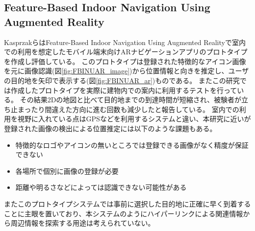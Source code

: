 \subsection{Feature-Based Indoor Navigation Using Augmented Reality}
KasprzakらはFeature-Based Indoor Navigation Using Augmented Reality\cite{6597797}で室内での利用を想定したモバイル端末向けARナビゲーションアプリのプロトタイプを作成し評価している。
このプロトタイプは登録された特徴的なアイコン画像を元に画像認識(図\ref{fig:FBINUAR_image})から位置情報と向きを推定し、ユーザの目的地を矢印で表示する(図\ref{fig:FBINUAR_ar})ものである。
またこの研究では作成したプロトタイプを実際に建物内での案内に利用するテストを行っている。
その結果2Dの地図と比べて目的地までの到達時間が短縮され、被験者が立ち止まったり間違えた方向に進む回数も減少したと報告している。
室内での利用を視野に入れている点はGPSなどを利用するシステムと違い、本研究に近いが登録された画像の検出による位置推定には以下のような課題もある。
\begin{itemize}
  \item 特徴的なロゴやアイコンの無いところでは登録できる画像がなく精度が保証できない
  \item 各場所で個別に画像の登録が必要
  \item 距離や明るさなどによっては認識できない可能性がある
\end{itemize}
またこのプロトタイプシステムでは事前に選択した目的地に正確に早く到着することに主眼を置いており、本システムのようにハイパーリンクによる関連情報から周辺情報を探索する用途は考えられていない。

